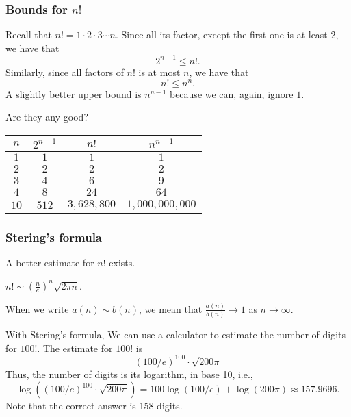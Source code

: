 \begin{frame}\frametitle{Bounds for $n!$}
  Recall that $n!=1\cdot 2\cdot 3\cdots n$.  Since all its factor,
  except the first one is at least 2, we have that
  \[ 2^{n-1}\leq n!. \] \pause
  Similarly, since all factors of $n!$ is at most $n$, we have that
  \[ n! \leq n^n.\] \pause
  A slightly better upper bound is $n^{n-1}$ because we can, again,
  ignore $1$.
  \pause

  \vspace{0.1in}
  Are they any good? \pause

  \begin{tabular}{c|c|c|c}
    $n$ & $2^{n-1}$ & $n!$ & $n^{n-1}$ \\ \hline
    $1$ & $1$ & $1$ & $1$ \\
    $2$ & $2$ & $2$ & $2$ \\
    $3$ & $4$ & $6$ & $9$ \\
    $4$ & $8$ & $24$ & $64$ \\
    $10$ & $512$ & $3,628,800$ & $1,000,000,000$
  \end{tabular}
\end{frame}


\begin{frame}\frametitle{Stering's formula}
  A better estimate for $n!$ exists.

  \begin{theorem}
    $n!\sim \left(\frac{n}{e}\right)^n\sqrt{2\pi n}$.
  \end{theorem}

  \vspace{0.2in}
  When we write $a(n)\sim b(n)$, we mean that
  $\frac{a(n)}{b(n)}\rightarrow 1$ as $n\rightarrow\infty$.
  \pause

  With Stering's formula, We can use a calculator to estimate the
  number of digits for $100!$.  \pause The estimate for $100!$ is
  \[ (100/e)^{100}\cdot\sqrt{200\pi}\]
  Thus, the number of digits is its logarithm, in base 10, i.e.,
  \[\log\left((100/e)^{100}\cdot\sqrt{200\pi}\right) = 100\log(100/e) + \log(200\pi) \approx 157.9696.\]
  \pause
  Note that the correct answer is 158 digits.
\end{frame}

